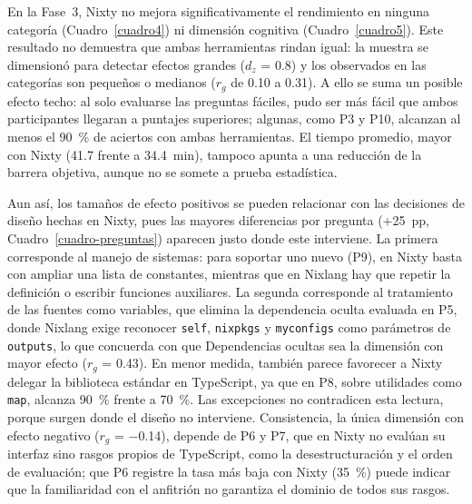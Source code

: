 En la Fase~3, Nixty no mejora significativamente el rendimiento en ninguna categoría (Cuadro~\ref{cuadro4}) ni dimensión cognitiva (Cuadro~\ref{cuadro5}). Este resultado no demuestra que ambas herramientas rindan igual: la muestra se dimensionó para detectar efectos grandes ($d_z$ = 0.8) y los observados en las categorías son pequeños o medianos ($r_g$ de 0.10 a 0.31). A ello se suma un posible efecto techo: al solo evaluarse las preguntas fáciles, pudo ser más fácil que ambos participantes llegaran a puntajes superiores; algunas, como P3 y P10, alcanzan al menos el 90~\% de aciertos con ambas herramientas. El tiempo promedio, mayor con Nixty (41.7 frente a 34.4~min), tampoco apunta a una reducción de la barrera objetiva, aunque no se somete a prueba estadística.

Aun así, los tamaños de efecto positivos se pueden relacionar con las decisiones de diseño hechas en Nixty, pues las mayores diferencias por pregunta (+25~pp, Cuadro~\ref{cuadro-preguntas}) aparecen justo donde este interviene. La primera corresponde al manejo de sistemas: para soportar uno nuevo (P9), en Nixty basta con ampliar una lista de constantes, mientras que en Nixlang hay que repetir la definición o escribir funciones auxiliares. La segunda corresponde al tratamiento de las fuentes como variables, que elimina la dependencia oculta evaluada en P5, donde Nixlang exige reconocer \texttt{self}, \texttt{nixpkgs} y \texttt{myconfigs} como parámetros de \texttt{outputs}, lo que concuerda con que Dependencias ocultas sea la dimensión con mayor efecto ($r_g$ = 0.43). En menor medida, también parece favorecer a Nixty delegar la biblioteca estándar en TypeScript, ya que en P8, sobre utilidades como \texttt{map}, alcanza 90~\% frente a 70~\%. Las excepciones no contradicen esta lectura, porque surgen donde el diseño no interviene. Consistencia, la única dimensión con efecto negativo ($r_g$ = $-$0.14), depende de P6 y P7, que en Nixty no evalúan su interfaz sino rasgos propios de TypeScript, como la desestructuración y el orden de evaluación; que P6 registre la tasa más baja con Nixty (35~\%) puede indicar que la familiaridad con el anfitrión no garantiza el dominio de todos sus rasgos.

